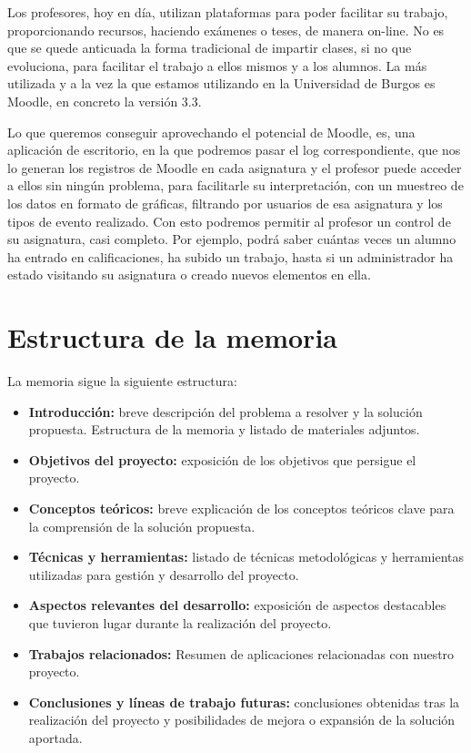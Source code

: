 
Los profesores, hoy en día, utilizan plataformas para poder facilitar su trabajo, proporcionando recursos, haciendo exámenes o teses, de manera on-line. No es que se quede anticuada la forma tradicional de impartir clases, si no que evoluciona, para facilitar el trabajo a ellos mismos y a los alumnos.
La más utilizada y a la vez la que estamos utilizando en la Universidad de Burgos es Moodle, en concreto la versión 3.3.




Lo que queremos conseguir aprovechando el potencial de Moodle, es, una aplicación de escritorio, en la que podremos pasar el log correspondiente, que nos lo generan los registros de Moodle en cada asignatura y el profesor puede acceder a ellos sin ningún problema, para facilitarle su interpretación, con un muestreo de los datos en formato de gráficas, filtrando por usuarios de esa asignatura y los tipos de evento realizado. 
Con esto podremos permitir al profesor un control de su asignatura, casi completo. Por ejemplo, podrá saber cuántas veces un alumno ha entrado en calificaciones, ha subido un trabajo, hasta si un administrador ha estado visitando su asignatura o creado nuevos elementos en ella.


\section{Estructura de la memoria}\label{estructura-de-la-memoria}

La memoria sigue la siguiente estructura:

\begin{itemize}
	\tightlist
	\item
	\textbf{Introducción:} breve descripción del problema a resolver y la
	solución propuesta. Estructura de la memoria y listado de materiales
	adjuntos.
	\item
	\textbf{Objetivos del proyecto:} exposición de los objetivos que
	persigue el proyecto.
	\item
	\textbf{Conceptos teóricos:} breve explicación de los conceptos
	teóricos clave para la comprensión de la solución propuesta.
	\item
	\textbf{Técnicas y herramientas:} listado de técnicas metodológicas y
	herramientas utilizadas para gestión y desarrollo del proyecto.
	\item
	\textbf{Aspectos relevantes del desarrollo:} exposición de aspectos
	destacables que tuvieron lugar durante la realización del proyecto.
	\item
	\textbf{Trabajos relacionados:} Resumen de aplicaciones relacionadas con nuestro proyecto.
	\item
	\textbf{Conclusiones y líneas de trabajo futuras:} conclusiones
	obtenidas tras la realización del proyecto y posibilidades de mejora o
	expansión de la solución aportada.
	
\end{itemize}

